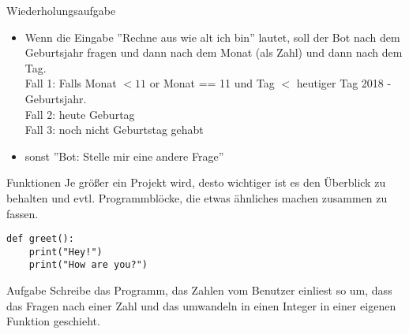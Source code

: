 \begin{frame}[fragile]{Wiederholungsaufgabe}

\begin{itemize}
	\item Wenn die Eingabe ''Rechne aus wie alt ich bin'' lautet, soll der Bot nach dem Geburtsjahr fragen und dann nach dem Monat (als Zahl) und dann nach dem Tag. \\Fall 1: Falls Monat $<11$ or Monat == 11 und Tag $<$ heutiger Tag 2018 - Geburtsjahr. \\
	Fall 2: heute Geburtag\\
	Fall 3: noch nicht Geburtstag gehabt
	\item sonst ''Bot: Stelle mir eine andere Frage'' 
\end{itemize}
\end{frame}

\begin{frame}[fragile]{Funktionen}
Je größer ein Projekt wird, desto wichtiger ist es den Überblick zu behalten
und evtl. Programmblöcke, die etwas ähnliches machen zusammen zu fassen.

\begin{lstlisting}
def greet():
    print("Hey!")
    print("How are you?")
\end{lstlisting}
\begin{block}{Aufgabe}
Schreibe das Programm, das Zahlen vom Benutzer einliest so um, dass das Fragen nach
einer Zahl und das umwandeln in einen Integer in einer eigenen Funktion geschieht.
\end{block}
\end{frame}


